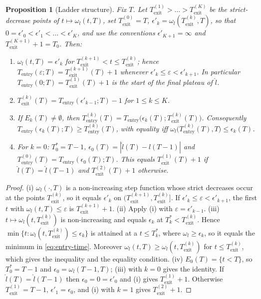 \documentclass[12pt,a4paper]{article}
\newtheorem{proposition}{Proposition}
\begin{document}
\begin{proposition}[Ladder structure]\label{prop:ladder}
	Fix $T$. Let $T_{\mathrm{exit}}^{(1)}>\dots>T_{\mathrm{exit}}^{(K)}$ be the
	strict-decrease points of $t\mapsto\omega_l(t,T)$, set
	$T_{\mathrm{exit}}^{(0)}=T$, $\epsilon'_k=\omega_l(T_{\mathrm{exit}}^{(k)},T)$,
	so that $0=\epsilon'_0<\epsilon'_1<\dots<\epsilon'_K$, and use the conventions
	$\epsilon'_{K+1}=\infty$ and $T_{\mathrm{exit}}^{(K+1)}+1=T_0$. Then:
	\begin{enumerate}
		\item[(i)] $\omega_l(t,T)=\epsilon'_k$ for
		$T_{\mathrm{exit}}^{(k+1)}<t\le T_{\mathrm{exit}}^{(k)}$; hence
		$T_{\mathrm{entry}}(\varepsilon;T)=T_{\mathrm{exit}}^{(k+1)}(T)+1$ whenever
		$\epsilon'_k\le\varepsilon<\epsilon'_{k+1}$. In particular
		$T_{\mathrm{entry}}(0;T)=T_{\mathrm{exit}}^{(1)}(T)+1$ is the start of the
		final plateau of $\hat l$.
		\item[(ii)] $T_{\mathrm{exit}}^{(k)}(T)=T_{\mathrm{entry}}(\epsilon'_{k-1};T)-1$
		for $1\le k\le K$.
		\item[(iii)] If $E_k(T)\neq\emptyset$, then
		$T_{\mathrm{entry}}^{(k)}(T)=T_{\mathrm{entry}}\bigl(\epsilon_k(T);T_{\mathrm{exit}}^{(k)}(T)\bigr)$.
		Consequently $T_{\mathrm{entry}}(\epsilon_k(T);T)\ge T_{\mathrm{entry}}^{(k)}(T)$,
		with equality iff $\omega_l\bigl(T_{\mathrm{entry}}^{(k)}(T),T\bigr)\le\epsilon_k(T)$.
		\item[(iv)] For $k=0$: $T_0^{*}=T-1$, $\epsilon_0(T)=|\hat l(T)-\hat l(T-1)|$ and
		$T_{\mathrm{entry}}^{(0)}(T)=T_{\mathrm{entry}}(\epsilon_0(T);T)$. This equals
		$T_{\mathrm{exit}}^{(1)}(T)+1$ if $\hat l(T)=\hat l(T-1)$ and
		$T_{\mathrm{exit}}^{(2)}(T)+1$ otherwise.
	\end{enumerate}
\end{proposition}

\begin{proof}
	(i) $\omega_l(\cdot,T)$ is a non-increasing step function whose strict
	decreases occur at the points $T_{\mathrm{exit}}^{(k)}$, so it equals
	$\epsilon'_k$ on $(T_{\mathrm{exit}}^{(k+1)},T_{\mathrm{exit}}^{(k)}]$. If
	$\epsilon'_k\le\varepsilon<\epsilon'_{k+1}$, the first $t$ with
	$\omega_l(t,T)\le\varepsilon$ is $T_{\mathrm{exit}}^{(k+1)}+1$.
	(ii) Apply (i) with $\varepsilon=\epsilon'_{k-1}$.
	(iii) $t\mapsto\omega_l(t,T_{\mathrm{exit}}^{(k)})$ is non-increasing and equals
	$\epsilon_k$ at $T_k^{*}<T_{\mathrm{exit}}^{(k)}$. Hence
	$\min\{t:\omega_l(t,T_{\mathrm{exit}}^{(k)})\le\epsilon_k\}$ is attained at a
	$t\le T_k^{*}$, where $\omega_l\ge\epsilon_k$, so it equals the minimum in
	\eqref{eq:entry-time}. Moreover $\omega_l(t,T)\ge\omega_l(t,T_{\mathrm{exit}}^{(k)})$
	for $t\le T_{\mathrm{exit}}^{(k)}$, which gives the inequality and the
	equality condition.
	(iv) $E_0(T)=\{t<T\}$, so $T_0^{*}=T-1$ and $\epsilon_0=\omega_l(T-1,T)$;
	(iii) with $k=0$ gives the identity. If $\hat l(T)=\hat l(T-1)$ then
	$\epsilon_0=0=\epsilon'_0$ and (i) gives $T_{\mathrm{exit}}^{(1)}+1$.
	Otherwise $T_{\mathrm{exit}}^{(1)}=T-1$, $\epsilon'_1=\epsilon_0$, and (i) with
	$k=1$ gives $T_{\mathrm{exit}}^{(2)}+1$.
\end{proof}
\end{document}
